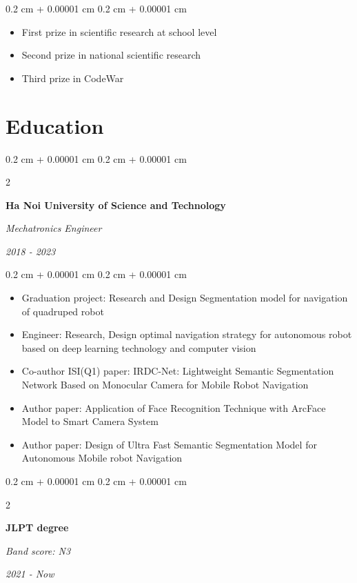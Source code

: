 \documentclass[10pt, letterpaper]{article}
\newenvironment{highlights}{
    \begin{itemize}[
        topsep=0.10 cm,
        parsep=0.10 cm,
        partopsep=0pt,
        itemsep=0pt,
        leftmargin=0.4 cm + 10pt
    ]
}{
    \end{itemize}
} %
\newenvironment{onecolentry}{
    \begin{adjustwidth}{
        0.2 cm + 0.00001 cm
    }{
        0.2 cm + 0.00001 cm
    }
}{
    \end{adjustwidth}
} %
\newenvironment{twocolentry}[2][]{
    \onecolentry
    \def\secondColumn{#2}
    \setcolumnwidth{\fill, 4.5 cm}
    \begin{paracol}{2}
}{
    \switchcolumn \raggedleft \secondColumn
    \end{paracol}
    \endonecolentry
} %
\begin{document}
    \begin{onecolentry}
        \begin{highlights}
            \item First prize in scientific research at school level
            \item Second prize in national scientific research
            \item Third prize in CodeWar
        \end{highlights}
    \end{onecolentry}

    \section{Education}

    \begin{twocolentry}{
        \textit{2018 - 2023}
    }
        \textbf{Ha Noi University of Science and Technology}
        
        \textit{Mechatronics Engineer}
    \end{twocolentry}

    \begin{onecolentry}
        \begin{highlights}
            \item Graduation project: Research and Design Segmentation model for navigation of quadruped robot
            \item Engineer: Research, Design optimal navigation strategy for autonomous robot based on deep learning technology and computer vision
            \item Co-author ISI(Q1) paper: IRDC-Net: Lightweight Semantic Segmentation Network Based on Monocular Camera for Mobile Robot Navigation
            \item Author paper: Application of Face Recognition Technique with ArcFace Model to Smart Camera System
            \item Author paper: Design of Ultra Fast Semantic Segmentation Model for Autonomous Mobile robot Navigation
        \end{highlights}
    \end{onecolentry}

    \vspace{0.2 cm}

    \begin{twocolentry}{
        \textit{2021 - Now}
    }
        \textbf{JLPT degree}
        
        \textit{Band score: N3}
    \end{twocolentry}
\end{document}

